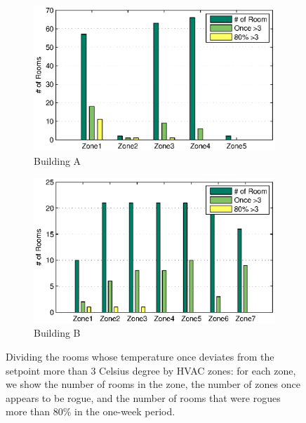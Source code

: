 \begin{figure}[h!]
\centering
	\begin{subfigure}{0.48\textwidth}
                \centering
		\includegraphics[width=\textwidth]{./figs/rogue_soda.eps}
                \caption{Building A}
	\end{subfigure}
	\begin{subfigure}{0.48\textwidth}
                \centering
		\includegraphics[width=\textwidth]{./figs/rogue_sdh.eps}
                \caption{Building B}
	\end{subfigure}
\caption{Dividing the rooms whose temperature once deviates from the setpoint more than 3 Celsius degree by HVAC zones: for each zone, we show the number of rooms in the zone, the number of zones once appears to be rogue, and the number of rooms that were rogues more than 80\% in the one-week period.} 
\label{fig:rogue}
\end{figure}
